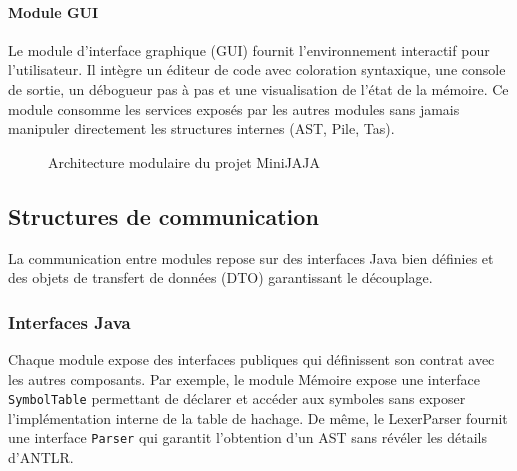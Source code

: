 \paragraph{Module GUI}
Le module d'interface graphique (GUI) fournit l'environnement interactif pour l'utilisateur. Il intègre un éditeur de code avec coloration syntaxique, une console de sortie, un débogueur pas à pas et une visualisation de l'état de la mémoire. Ce module consomme les services exposés par les autres modules sans jamais manipuler directement les structures internes (AST, Pile, Tas).

\begin{figure}[h]
    \centering
    \caption{Architecture modulaire du projet MiniJAJA}
\end{figure}

\subsection{Structures de communication}

La communication entre modules repose sur des interfaces Java bien définies et des objets de transfert de données (DTO) garantissant le découplage.

\subsubsection{Interfaces Java}

Chaque module expose des interfaces publiques qui définissent son contrat avec les autres composants. Par exemple, le module Mémoire expose une interface \texttt{SymbolTable} permettant de déclarer et accéder aux symboles sans exposer l'implémentation interne de la table de hachage. De même, le LexerParser fournit une interface \texttt{Parser} qui garantit l'obtention d'un AST sans révéler les détails d'ANTLR.

